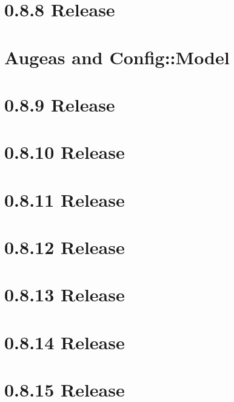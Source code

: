 \let\mypdfximage\pdfximage\def\pdfximage{\immediate\mypdfximage}\documentclass[twoside]{book}
\newcommand{\+}{\discretionary{\mbox{\scriptsize$\hookleftarrow$}}{}{}}
\begin{document}
\chapter{0.8.8 Release}
\label{doc_news_2014-09-02_0_8_8_md}

\chapter{Augeas and Config\+::Model}
\label{doc_news_2014-10-22_augeas_md}

\chapter{0.8.9 Release}
\label{doc_news_2014-11-04_0_8_9_md}

\chapter{0.8.10 Release}
\label{doc_news_2014-12-02_0_8_10_md}

\chapter{0.8.11 Release}
\label{doc_news_2015-04-03_0_8_11_md}

\chapter{0.8.12 Release}
\label{doc_news_2015-07-13_0_8_12_md}

\chapter{0.8.13 Release}
\label{doc_news_2015-09-17_0_8_13_md}

\chapter{0.8.14 Release}
\label{doc_news_2015-11-19_0_8_14_md}

\chapter{0.8.15 Release}
\label{doc_news_2016-02-16_0_8_15_md}

\end{document}
